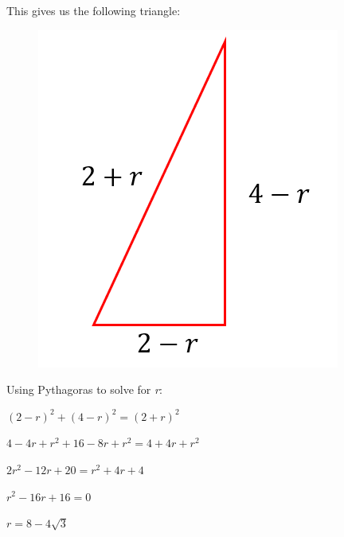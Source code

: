 \documentclass[../main.tex]{subfiles}
\begin{document}
\begin{enumerate}[itemsep=1cm]
    This gives us the following triangle:

    \begin{figure}[H]
        \centering
        \includegraphics[width=0.25\linewidth]{images/t2w8q4a2.png}
    \end{figure}

    Using Pythagoras to solve for \textit{r}:

    $(2-r)^2+(4-r)^2=(2+r)^2$

    $4-4r+r^2+16-8r+r^2=4+4r+r^2$

    $2r^2-12r+20=r^2+4r+4$

    $r^2-16r+16=0$

    $r=8-4\sqrt{3}$

\end{enumerate}
\end{document}
